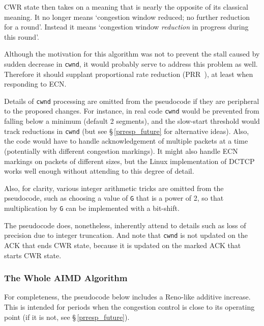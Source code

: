 CWR state then takes on a meaning that is nearly the opposite of its classical
meaning. It no longer means `congestion window reduced; no further reduction for
a round'. Instead it means `congestion window \emph{reduction} in progress
during this round'. 

Although the motivation for this algorithm was not to prevent the stall caused
by sudden decrease in \texttt{cwnd}, it would probably serve to address this
problem as well. Therefore it should supplant proportional rate reduction
(PRR~\cite{IETF_RFC6937:PRR}), at least when responding to ECN.

Details of \texttt{cwnd} processing are omitted from the pseudocode if they are
peripheral to the proposed changes. For instance, in real code \texttt{cwnd}
would be prevented from falling below a minimum (default 2 segments), and the
slow-start threshold would track reductions in \texttt{cwnd} (but see
\S\,\ref{prresp_future} for alternative ideas). Also, the code would have to
handle acknowledgement of multiple packets at a time (potentially with different
congestion markings). It might also handle ECN markings on packets of different
sizes, but the Linux implementation of DCTCP works well enough without attending
to this degree of detail.

Also, for clarity, various integer arithmetic tricks are omitted from the
pseudocode, such as choosing a value of \texttt{G} that is a power of 2, so that
multiplication by \texttt{G} can be implemented with a bit-shift.

The pseudocode does, nonetheless, inherently attend to details such as loss of
precision due to integer truncation. And note that \texttt{cwnd} is not updated
on the ACK that ends CWR state, because it is updated on the marked ACK that
starts CWR state.

\subsubsection{The Whole AIMD Algorithm}\label{prresp_AIMD}

For completeness, the pseudocode below %
includes a Reno-like additive increase.
This is intended for periods when the congestion control is close to its
operating point (if it is not, see \S\,\ref{prresp_future}).

